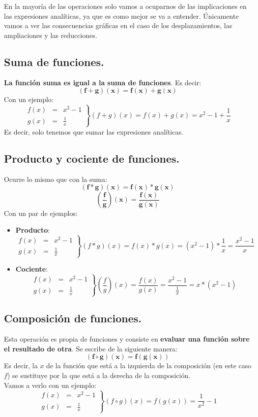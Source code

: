 \documentclass[a4paper,11pt,answers]{exam}
\newcommand\ddfrac[2]{\frac{\displaystyle #1}{\displaystyle #2}}
\begin{document}
En la mayoría de las operaciones solo vamos a ocuparnos de las implicaciones en las expresiones analíticas, ya que es como mejor se va a entender. Únicamente vamos a ver las consecuencias gráficas en el caso de los desplazamientos, las ampliaciones y las reducciones.
\subsection{Suma de funciones.}
\textbf{La función suma es igual a la suma de funciones}. Es decir:
\[\boldsymbol{(f+g)(x) = f(x) + g(x)}\]
Con un ejemplo:
\[\left.\begin{array}{lcl}
	f(x) &=& x^2 - 1\\
	g(x) &=& \frac{1}{x}
\end{array}\right\rbrace (f+g)(x) = f(x) + g(x) = x^2-1 + \frac{1}{x}\]
Es decir, solo tenemos que sumar las expresiones analíticas.
\subsection{Producto y cociente de funciones.}
Ocurre lo mismo que con la suma:
\[\boldsymbol{(f*g)(x) = f(x) *g(x)}\]
\[\boldsymbol{\left(\frac{f}{g}\right)(x) = \frac{f(x)}{g(x)}}\]
Con un par de ejemplos:
\begin{itemize}
	\item \textbf{Producto}:
	\[\left.\begin{array}{lcl}
	f(x) &=& x^2 - 1\\
	g(x) &=& \frac{1}{x}
\end{array}\right\rbrace (f*g)(x) = f(x) * g(x) = (x^2-1)* \frac{1}{x} = \frac{x^2 - 1}{x}\]
	\item \textbf{Cociente}:
	\[\left.\begin{array}{lcl}
	f(x) &=& x^2 - 1\\
	g(x) &=& \frac{1}{x}
\end{array}\right\rbrace \left(\frac{f}{g}\right)(x) = \frac{f(x)}{g(x)} = \ddfrac{x^2-1}{\frac{1}{x}} = x*(x^2- 1)\]
\end{itemize}
\subsection{Composición de funciones.}
Esta operación es propia de funciones y consiste en \textbf{evaluar una función sobre el resultado de otra}. Se escribe de la siguiente manera:
\[\boldsymbol{(f \circ g)(x) = f\left(g(x)\right)}\]
Es decir, la $x$ de la función que está a la izquierda de la composición (en este caso $f$) se sustituye por la que está a la derecha de la composición.\\
Vamos a verlo con un ejemplo:
\[\left.\begin{array}{lcl}
	f(x) &=& x^2 - 1\\
	g(x) &=& \frac{1}{x}
\end{array}\right\rbrace (f\circ g)(x) = f\left(g(x)\right) = \frac{1}{x^2} - 1\]
\end{document}
